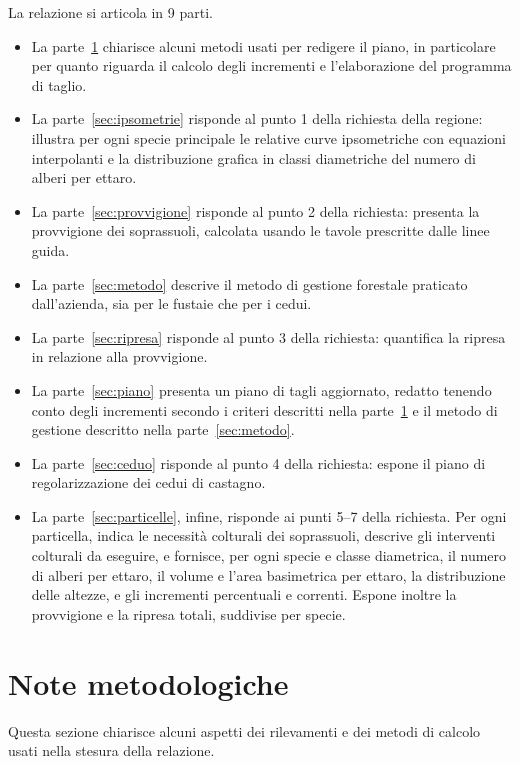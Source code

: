 \documentclass[a4paper,11pt]{article}
\begin{document}
La relazione si articola in 9 parti.
\begin{itemize}
\item La parte~\ref{sec:note-metodologia} chiarisce alcuni metodi usati per redigere il piano, in particolare per quanto riguarda il calcolo degli incrementi e l'elaborazione del programma di taglio.
\item La parte~\ref{sec:ipsometrie} risponde al punto 1 della richiesta della regione: illustra per ogni specie principale le relative curve ipsometriche con equazioni interpolanti e la distribuzione grafica in classi diametriche del numero di alberi per ettaro.
\item La parte~\ref{sec:provvigione} risponde al punto 2 della richiesta: presenta la provvigione dei soprassuoli, calcolata usando le tavole prescritte dalle linee guida.
\item La parte~\ref{sec:metodo} descrive il metodo di gestione forestale praticato dall'azienda, sia per le fustaie che per i cedui.
\item La parte~\ref{sec:ripresa} risponde al punto 3 della richiesta: quantifica la ripresa in relazione alla provvigione.
\item La parte~\ref{sec:piano} presenta un piano di tagli aggiornato, redatto tenendo conto degli incrementi secondo i criteri descritti nella parte~\ref{sec:note-metodologia} e il metodo di gestione descritto nella parte~\ref{sec:metodo}.
\item La parte~\ref{sec:ceduo} risponde al punto 4 della richiesta: espone il piano di regolarizzazione dei cedui di castagno.

\item La parte~\ref{sec:particelle}, infine, risponde ai punti 5--7 della richiesta. Per ogni particella, indica le necessità colturali dei soprassuoli, descrive gli interventi colturali da eseguire, e fornisce, per ogni specie e classe diametrica, il numero di alberi per ettaro, il volume e l'area basimetrica per ettaro, la distribuzione delle altezze, e gli incrementi percentuali e correnti. Espone inoltre la provvigione e la ripresa totali, suddivise per specie.
\end{itemize}

\section{Note metodologiche}
\label{sec:note-metodologia}

Questa sezione chiarisce alcuni aspetti dei rilevamenti e dei metodi di calcolo usati nella stesura della relazione.
\end{document}
